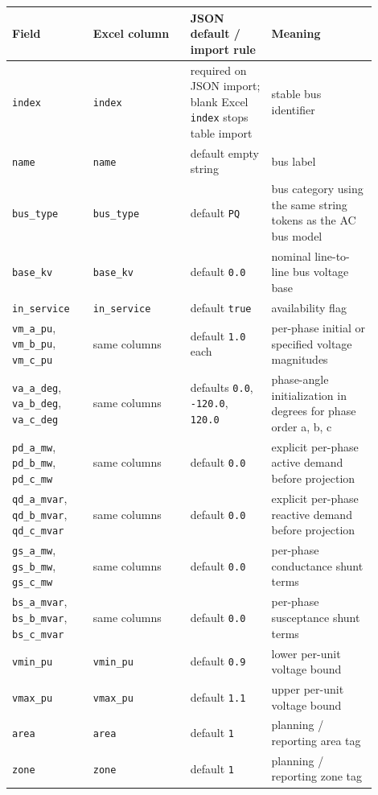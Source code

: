 \begin{longtable}{L{0.20\linewidth}L{0.24\linewidth}L{0.20\linewidth}L{0.26\linewidth}}
\toprule
Field & Excel column & JSON default / import rule & Meaning \\
\midrule
\endhead
\texttt{index} & \texttt{index} & required on JSON import; blank Excel \texttt{index} stops table import & stable bus identifier \\
\texttt{name} & \texttt{name} & default empty string & bus label \\
\texttt{bus\_type} & \texttt{bus\_type} & default \texttt{PQ} & bus category using the same string tokens as the AC bus model \\
\texttt{base\_kv} & \texttt{base\_kv} & default \texttt{0.0} & nominal line-to-line bus voltage base \\
\texttt{in\_service} & \texttt{in\_service} & default \texttt{true} & availability flag \\
\texttt{vm\_a\_pu}, \texttt{vm\_b\_pu}, \texttt{vm\_c\_pu} & same columns & default \texttt{1.0} each & per-phase initial or specified voltage magnitudes \\
\texttt{va\_a\_deg}, \texttt{va\_b\_deg}, \texttt{va\_c\_deg} & same columns & defaults \texttt{0.0}, \texttt{-120.0}, \texttt{120.0} & phase-angle initialization in degrees for phase order a, b, c \\
\texttt{pd\_a\_mw}, \texttt{pd\_b\_mw}, \texttt{pd\_c\_mw} & same columns & default \texttt{0.0} & explicit per-phase active demand before projection \\
\texttt{qd\_a\_mvar}, \texttt{qd\_b\_mvar}, \texttt{qd\_c\_mvar} & same columns & default \texttt{0.0} & explicit per-phase reactive demand before projection \\
\texttt{gs\_a\_mw}, \texttt{gs\_b\_mw}, \texttt{gs\_c\_mw} & same columns & default \texttt{0.0} & per-phase conductance shunt terms \\
\texttt{bs\_a\_mvar}, \texttt{bs\_b\_mvar}, \texttt{bs\_c\_mvar} & same columns & default \texttt{0.0} & per-phase susceptance shunt terms \\
\texttt{vmin\_pu} & \texttt{vmin\_pu} & default \texttt{0.9} & lower per-unit voltage bound \\
\texttt{vmax\_pu} & \texttt{vmax\_pu} & default \texttt{1.1} & upper per-unit voltage bound \\
\texttt{area} & \texttt{area} & default \texttt{1} & planning / reporting area tag \\
\texttt{zone} & \texttt{zone} & default \texttt{1} & planning / reporting zone tag \\
\bottomrule
\end{longtable}

